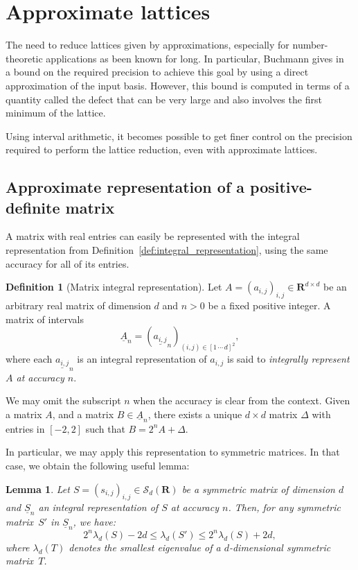 \documentclass{amsart}
\newcommand{\inter}[1]{\underline{#1}}
\newcommand{\RR}{\mathbf{R}}
\newtheorem{lemma}[theorem]{Lemma}
\theoremstyle{definition}
\newtheorem{definition}[theorem]{Definition}
\begin{document}
 
\section{Approximate lattices}
The need to reduce lattices given by approximations, especially for
number-theoretic applications as been known for long. In particular,
Buchmann gives in~\cite{Buchmann94} a bound on the required precision
to achieve this goal by using a direct approximation of the input
basis. However, this bound is computed in terms of a quantity called
the defect that can be very large and also involves the first minimum
of the lattice.

Using interval arithmetic, it becomes possible to get finer control on
the precision required to perform the lattice reduction, even with
approximate lattices.

\subsection{Approximate representation of a positive-definite matrix}
\label{sec:matrix_representation}
A matrix with real entries  can easily be represented with the integral
representation from Definition~\ref{def:integral_representation},
using the same accuracy for all of its entries.

\begin{definition}[Matrix integral representation]
\label{def:matintrep}
  Let $A=(a_{i,j})_{i,j}\in\RR^{d\times d}$ 
  be an arbitrary real matrix of dimension $d$ and $n>0$ be a fixed positive integer.
  A matrix of intervals 
  \[ \inter{A}_n = 
      (\inter{a_{i,j}}_n)_{(i,j)\in [1\,\cdots\,d]^2},
  \]
where each $\inter{a_{i,j}}_n$ is an integral representation of
$a_{i,j}$  is said to \emph{integrally represent~$A$ at accuracy
  $n$}.
\end{definition}

We may omit the subscript $n$ when the accuracy is clear from the 
context. Given a matrix $A$,  and a matrix $B\in\inter{A}_n$, there
exists a unique $d\times d$ matrix $\Delta$ with entries in
$[-2, 2]$ such that $B= 2^n A+\Delta$.

In particular, we may apply this representation to symmetric
matrices. In that case, we obtain the following useful lemma:

\begin{lemma}
  \label{lem:minimal_eigenvalue}
    Let $S=(s_{i,j})_{i,j}\in\mathcal{S}_d(\RR)$ be a symmetric
    matrix of dimension $d$ and $\inter{S}_n$ an integral
    representation of $S$ at accuracy $n$. Then, for any symmetric
    matrix~$S'$ in $\inter{S}_n$, we have:
    $$2^n\lambda_d(S)-2d\leq \lambda_d(S') \leq 2^n\lambda_d(S)+2d,$$
    where $\lambda_d(T)$ denotes the smallest eigenvalue of a $d$-dimensional
    symmetric matrix~$T$.
\end{lemma}
\end{document}
